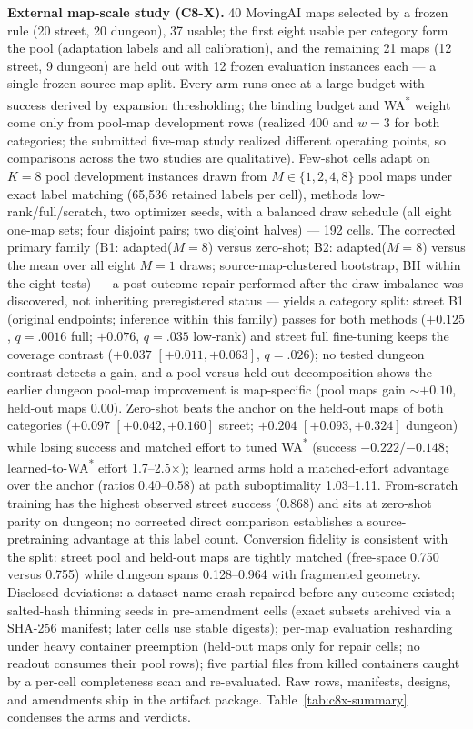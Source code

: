 \documentclass[letterpaper]{article} %
\begin{document}
\clearpage
\textbf{External map-scale study (C8-X).} 40 MovingAI maps selected by a
frozen rule (20 street, 20 dungeon), 37 usable; the first eight usable
per category form the pool (adaptation labels and all calibration), and
the remaining 21 maps (12 street, 9 dungeon) are held out with 12 frozen
evaluation instances each --- a single frozen source-map split. Every arm
runs once at a large budget with success derived by expansion
thresholding; the binding budget and WA\textsuperscript{*} weight come
only from pool-map development rows (realized 400 and $w{=}3$ for both
categories; the submitted five-map study realized different operating
points, so comparisons across the two studies are qualitative). Few-shot
cells adapt on $K{=}8$ pool development instances drawn from $M \in \{1,
2, 4, 8\}$ pool maps under exact label matching (65{,}536 retained labels
per cell), methods low-rank/full/scratch, two optimizer seeds, with a
balanced draw schedule (all eight one-map sets; four disjoint pairs; two
disjoint halves) --- 192 cells. The corrected primary family (B1:
adapted($M{=}8$) versus zero-shot; B2: adapted($M{=}8$) versus the mean
over all eight $M{=}1$ draws; source-map-clustered bootstrap, BH within
the eight tests) --- a post-outcome repair performed after the draw imbalance was discovered, not inheriting preregistered status --- yields a category split: street B1 (original endpoints; inference within this family) passes for both
methods ($+0.125$, $q{=}.0016$ full; $+0.076$, $q{=}.035$ low-rank) and
street full fine-tuning keeps the coverage contrast ($+0.037$
$[+0.011,+0.063]$, $q{=}.026$); no tested dungeon contrast detects a gain, and a
pool-versus-held-out decomposition shows the earlier dungeon
pool-map improvement is map-specific (pool maps gain ${\sim}+0.10$, held-out maps
$0.00$). Zero-shot beats the anchor on the held-out maps of both
categories ($+0.097$ $[+0.042,+0.160]$ street; $+0.204$ $[+0.093,+0.324]$
dungeon) while losing success and matched effort to tuned
WA\textsuperscript{*} (success $-0.222$/$-0.148$; learned-to-WA\textsuperscript{*}
effort 1.7--2.5$\times$); learned arms hold a matched-effort advantage
over the anchor (ratios 0.40--0.58) at path suboptimality 1.03--1.11.
From-scratch training has the highest observed street success (0.868)
and sits at zero-shot parity on dungeon; no corrected direct comparison
establishes a source-pretraining advantage at this label count. Conversion fidelity is consistent with the
split: street pool and held-out maps are tightly matched (free-space
0.750 versus 0.755) while dungeon spans 0.128--0.964 with fragmented
geometry. Disclosed deviations: a dataset-name crash repaired before any
outcome existed; salted-hash thinning seeds in pre-amendment cells
(exact subsets archived via a SHA-256 manifest; later cells use stable
digests); per-map evaluation resharding under heavy container preemption
(held-out maps only for repair cells; no readout consumes their pool
rows); five partial files from killed containers caught by a per-cell
completeness scan and re-evaluated. Raw rows, manifests, designs, and
amendments ship in the artifact package. Table~\ref{tab:c8x-summary} condenses the arms and verdicts.
\end{document}
